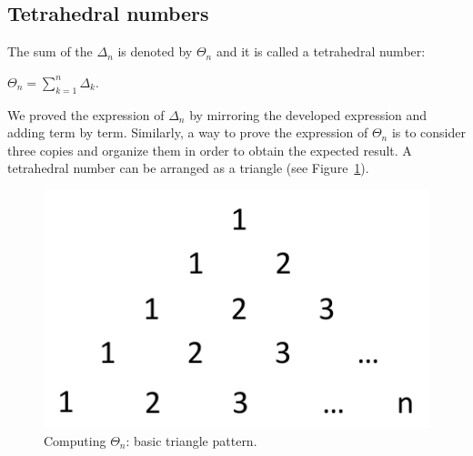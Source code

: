 
\subsection{Tetrahedral numbers}

The sum of the $\Delta_n$ is denoted by $\Theta_n$ and it is called a tetrahedral number:

$\Theta_n =  \sum_{k=1}^{n} \Delta_k$.


We proved the expression of $\Delta_n$ by mirroring the developed expression and adding term by term.
Similarly, a way to prove the expression of $\Theta_n$ is to consider three copies and organize them 
in order to obtain the expected result.
A tetrahedral number can be arranged as a triangle (see Figure~\ref{fig:TetrahedralBasic}).
\begin{figure}[h]
\begin{center}
        \includegraphics[scale=0.5]{FiguresArithmetic/TetrahedralBasic}
        \caption{Computing $\Theta_n$: basic triangle pattern.}
        \label{fig:TetrahedralBasic}
\end{center}
\end{figure}

